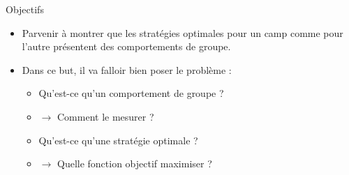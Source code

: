 \documentclass[final,hyperref={pdfpagelabels=false}]{beamer}
\begin{document}
\begin{frame}[t]
\begin{columns}[t]
\begin{column}{.465\textwidth}

\begin{block}{Objectifs}
\begin{itemize}
\item Parvenir \`a montrer que les strat\'egies optimales pour un camp comme pour l'autre pr\'esentent des comportements de groupe.
\item Dans ce but, il va falloir bien poser le probl\`eme : 
\begin{itemize}
\item Qu'est-ce qu'un comportement de groupe ?
\item[] $\to$ Comment le mesurer ?
\item Qu'est-ce qu'une strat\'egie optimale ?
\item[] $\to$ Quelle fonction objectif maximiser ?
\end{itemize}
\end{itemize}
\end{block}



\end{column}
\end{columns}
\end{frame}
\end{document}
